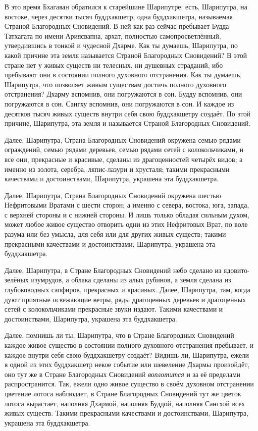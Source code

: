 \documentclass[openany, oneside]{book}
\begin{document}
В это время Бхагаван обратился к старейшине Шарипутре: есть, Шарипутра, на востоке, через десятки тысяч буддхакшетр, одна буддхакшетра, называемая Страной Благородных Сновидений. В ней как раз сейчас пребывает Будда Татхагата по имени Ариясвапна, архат, полностью самопросветлённый, утвердившись в тонкой и чудесной Дхарме. Как ты думаешь, Шарипутра, по какой причине эта земля называется Страной Благородных Сновидений? В этой стране нет у живых существ ни телесных, ни душевных страданий, ибо пребывают они в состоянии полного духовного отстранения. Как ты думаешь, Шарипутра, что позволяет живым существам достичь полного духовного отстранения? Дхарму вспомнив, они погружаются в сон. Будду вспомнив, они погружаются в сон. Сангху вспомнив, они погружаются в сон. И каждое из десятков тысяч живых существ внутри себя свою буддхакшетру создаёт. По этой причине, Шарипутра, эта земля и называется Страной Благородных Сновидений.

Далее, Шарипутра, Страна Благородных Сновидений окружена семью рядами ограждений, семью рядами деревьев, семью рядами сетей с колокольчиками, и все они, прекрасные и красивые, сделаны из драгоценностей четырёх видов; а именно из золота, серебра, ляпис-лазури и хрусталя; такими прекрасными качествами и достоинствами, Шарипутра, украшена эта буддхакшетра.

Далее, Шарипутра, Страна Благородных Сновидений окружена шестью Нефритовыми Вратами с шести сторон; а именно с севера, востока, юга, запада, с верхней стороны и с нижней стороны. И лишь только обладая сильным духом, может любое живое существо отворить одни из этих Нефритовых Врат, по воле разума или без умысла, для себя или для других живых существ; такими прекрасными качествами и достоинствами, Шарипутра, украшена эта буддхакшетра.

Далее, Шарипутра, в Стране Благородных Сновидений небо сделано из ядовито-зелёных изумрудов, а облака сделаны из алых рубинов, а земля сделана из глубоководных сапфиров, прекрасных и красивых. Далее, Шарипутра, там, когда дуют приятные освежающие ветры, ряды драгоценных деревьев и драгоценных сетей с колокольчиками прекрасные звуки издают. Такими качествами и достоинствами, Шарипутра, украшена эта буддхакшетра.

Далее, помнишь ли ты, Шарипутра, что в Стране Благородных Сновидений каждое живое существо в состоянии полного духовного отстранения пребывает, и каждое внутри себя свою буддхакшетру создаёт? Видишь ли, Шарипутра, ежели в одной из этих буддхакшетр некое событие или шевеление Дхармы произойдёт, оно тут же в Стране Благородных Сновидений \textit{воплотится} и за её пределами распространится. Так, ежели одно живое существо в своём духовном отстранении цветение лотоса наблюдает, в Стране Благородных Сновидений тут же цветок лотоса вырастает, наполняя Дхармой, наполняя Буддой, наполняя Сангхой всех живых существ. Такими прекрасными качествами и достоинствами, Шарипутра, украшена эта буддхакшетра.
\end{document}
